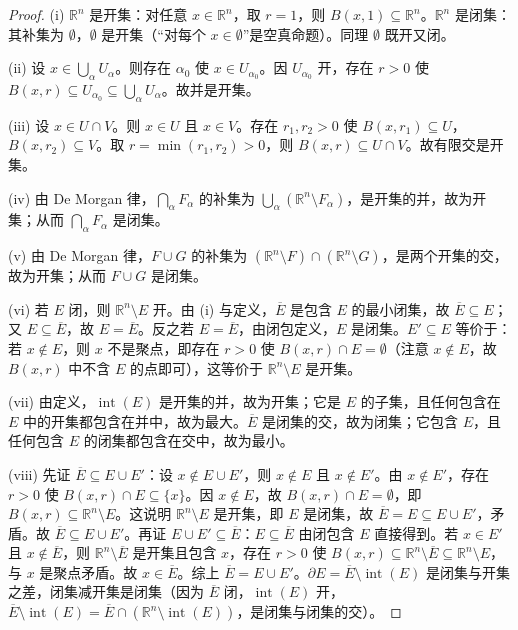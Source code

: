 \begin{proof}
(i) $\mathbb{R}^n$ 是开集：对任意 $x \in \mathbb{R}^n$，取 $r = 1$，则 $B(x, 1) \subseteq \mathbb{R}^n$。$\mathbb{R}^n$ 是闭集：其补集为 $\emptyset$，$\emptyset$ 是开集（“对每个 $x \in \emptyset$”是空真命题）。同理 $\emptyset$ 既开又闭。

(ii) 设 $x \in \bigcup_\alpha U_\alpha$。则存在 $\alpha_0$ 使 $x \in U_{\alpha_0}$。因 $U_{\alpha_0}$ 开，存在 $r > 0$ 使 $B(x, r) \subseteq U_{\alpha_0} \subseteq \bigcup_\alpha U_\alpha$。故并是开集。

(iii) 设 $x \in U \cap V$。则 $x \in U$ 且 $x \in V$。存在 $r_1, r_2 > 0$ 使 $B(x, r_1) \subseteq U$，$B(x, r_2) \subseteq V$。取 $r = \min(r_1, r_2) > 0$，则 $B(x, r) \subseteq U \cap V$。故有限交是开集。

(iv) 由 De Morgan 律，$\bigcap_\alpha F_\alpha$ 的补集为 $\bigcup_\alpha (\mathbb{R}^n \setminus F_\alpha)$，是开集的并，故为开集；从而 $\bigcap_\alpha F_\alpha$ 是闭集。

(v) 由 De Morgan 律，$F \cup G$ 的补集为 $(\mathbb{R}^n \setminus F) \cap (\mathbb{R}^n \setminus G)$，是两个开集的交，故为开集；从而 $F \cup G$ 是闭集。

(vi) 若 $E$ 闭，则 $\mathbb{R}^n \setminus E$ 开。由 (i) 与定义，$\overline{E}$ 是包含 $E$ 的最小闭集，故 $\overline{E} \subseteq E$；又 $E \subseteq \overline{E}$，故 $E = \overline{E}$。反之若 $E = \overline{E}$，由闭包定义，$E$ 是闭集。$E' \subseteq E$ 等价于：若 $x \notin E$，则 $x$ 不是聚点，即存在 $r > 0$ 使 $B(x, r) \cap E = \emptyset$（注意 $x \notin E$，故 $B(x, r)$ 中不含 $E$ 的点即可），这等价于 $\mathbb{R}^n \setminus E$ 是开集。

(vii) 由定义，$\operatorname{int}(E)$ 是开集的并，故为开集；它是 $E$ 的子集，且任何包含在 $E$ 中的开集都包含在并中，故为最大。$\overline{E}$ 是闭集的交，故为闭集；它包含 $E$，且任何包含 $E$ 的闭集都包含在交中，故为最小。

(viii) 先证 $\overline{E} \subseteq E \cup E'$：设 $x \notin E \cup E'$，则 $x \notin E$ 且 $x \notin E'$。由 $x \notin E'$，存在 $r > 0$ 使 $B(x, r) \cap E \subseteq \{x\}$。因 $x \notin E$，故 $B(x, r) \cap E = \emptyset$，即 $B(x, r) \subseteq \mathbb{R}^n \setminus E$。这说明 $\mathbb{R}^n \setminus E$ 是开集，即 $E$ 是闭集，故 $\overline{E} = E \subseteq E \cup E'$，矛盾。故 $\overline{E} \subseteq E \cup E'$。再证 $E \cup E' \subseteq \overline{E}$：$E \subseteq \overline{E}$ 由闭包含 $E$ 直接得到。若 $x \in E'$ 且 $x \notin \overline{E}$，则 $\mathbb{R}^n \setminus \overline{E}$ 是开集且包含 $x$，存在 $r > 0$ 使 $B(x, r) \subseteq \mathbb{R}^n \setminus \overline{E} \subseteq \mathbb{R}^n \setminus E$，与 $x$ 是聚点矛盾。故 $x \in \overline{E}$。综上 $\overline{E} = E \cup E'$。$\partial E = \overline{E} \setminus \operatorname{int}(E)$ 是闭集与开集之差，闭集减开集是闭集（因为 $\overline{E}$ 闭，$\operatorname{int}(E)$ 开，$\overline{E} \setminus \operatorname{int}(E) = \overline{E} \cap (\mathbb{R}^n \setminus \operatorname{int}(E))$，是闭集与闭集的交）。
\end{proof}

